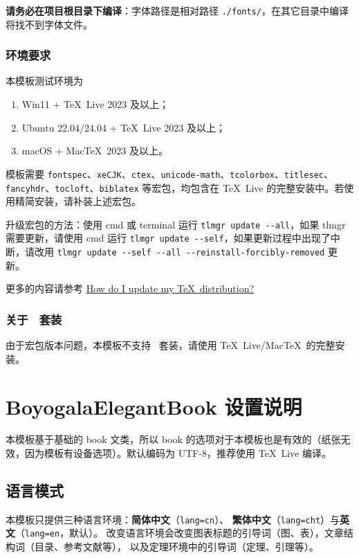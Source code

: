 \documentclass[lang=cn,10pt,scheme=chinese]{boyogalaelegantbook}
\begin{document}
\textbf{请务必在项目根目录下编译}：字体路径是相对路径 \lstinline{./fonts/}，在其它目录中编译将找不到字体文件。

\subsection{环境要求}

本模板测试环境为
\begin{enumerate}
  \item Win11 + \TeX~Live 2023 及以上；
  \item Ubuntu 22.04/24.04 + \TeX~Live 2023 及以上；
  \item macOS + Mac\TeX\ 2023 及以上。
\end{enumerate}

模板需要 \lstinline{fontspec}、\lstinline{xeCJK}、\lstinline{ctex}、\lstinline{unicode-math}、\lstinline{tcolorbox}、\lstinline{titlesec}、\lstinline{fancyhdr}、\lstinline{tocloft}、\lstinline{biblatex} 等宏包，均包含在 \TeX~Live 的完整安装中。若使用精简安装，请补装上述宏包。

升级宏包的方法：使用 cmd 或 terminal 运行 \lstinline{tlmgr update --all}，如果 tlmgr 需要更新，请使用 cmd 运行 \lstinline{tlmgr update --self}，如果更新过程中出现了中断，请改用 \lstinline{tlmgr update --self --all --reinstall-forcibly-removed} 更新。

更多的内容请参考 \href{https://tex.stackexchange.com/questions/55437/how-do-i-update-my-tex-distribution}{How do I update my \TeX\ distribution?}

\subsection{关于 \CTeX\ 套装}

由于宏包版本问题，本模板不支持 \CTeX\ 套装，请使用 \TeX~Live/Mac\TeX\ 的完整安装。

\chapter{BoyogalaElegantBook 设置说明}

本模板基于基础的 book 文类，所以 book 的选项对于本模板也是有效的（纸张无效，因为模板有设备选项）。默认编码为 UTF-8，推荐使用 \TeX~Live 编译。

\section{语言模式}
本模板只提供三种语言环境：\textbf{简体中文}（\lstinline{lang=cn}）、
\textbf{繁体中文}（\lstinline{lang=cht}）与\textbf{英文}（\lstinline{lang=en}，默认）。
改变语言环境会改变图表标题的引导词（图、表），文章结构词（目录、参考文献等），
以及定理环境中的引导词（定理、引理等）。
\end{document}
